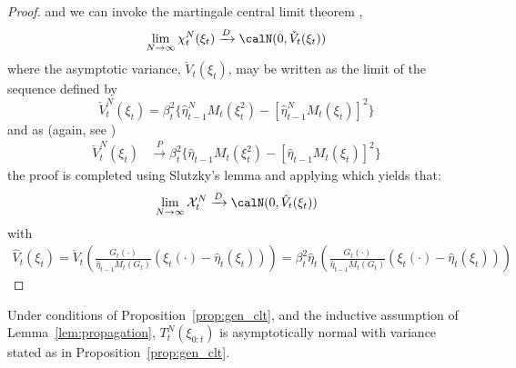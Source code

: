 \begin{proof}
  and we can invoke the martingale central
  limit theorem \cite[pp.~543]{Shiryaev:1995vp},
  \begin{equation}
    \lim_{N \to\infty}\chi_t^N(\xi_t)%
    \xrightarrow{D}\calN(0,\check{V}_t(\xi_t))
  \end{equation}
  where the asymptotic variance, $\check{V}_t(\xi_t)$, may be written as the limit
  of the sequence defined by
  \begin{equation}
    \check{V}_t^N(\xi_t) = \beta_t^2 \{\hat\eta_{t-1}^N M_t (\xi_t^2) -
      [\hat\eta_{t-1}^NM_t(\xi_t)]^2\}
  \end{equation}
  and as (again, see \cite[Section 7.4]{DelMoral:2004ux})
  \begin{align*}
    \check{V}_t^N(\xi_t)
    &\xrightarrow{P} \beta_t^2 \{\hat\eta_{t-1}M_t(\xi_t^2) -
      [\hat\eta_{t-1}M_t(\xi_t)]^2\}
  \end{align*}
  the proof is completed using Slutzky's lemma and applying \cite[Lemma A2]{Chopin:2004cn} which
  yields that:
\begin{align*}
\lim_{N \rightarrow \infty} \mathcal{X}_t^N \xrightarrow{D} \calN(0,\hat{V}_t(\xi_t))
\end{align*}
with
\begin{align*}
\hat{V}_t(\xi_t) =
\check{V}_t\left(\frac{G_t(\cdot)}{\hat\eta_{t-1}M_t(G_t)} (\xi_t(\cdot) -
\hat\eta_t(\xi_t)) \right) =
\beta_t^2 \hat\eta_t\left(
\frac{G_t(\cdot)}{\hat\eta_{t-1}M_t(G_t)} (\xi_t(\cdot) -
\hat\eta_t(\xi_t))
\right)
\end{align*}
\end{proof}

\begin{lemma}\label{lem:normality}
  Under conditions of Proposition~\ref{prop:gen_clt}, and the inductive
  assumption of Lemma~\ref{lem:propagation}, $T_t^N(\xi_{0:t})$ is
  asymptotically normal with variance stated as in
  Proposition~\ref{prop:gen_clt}.
\end{lemma}

